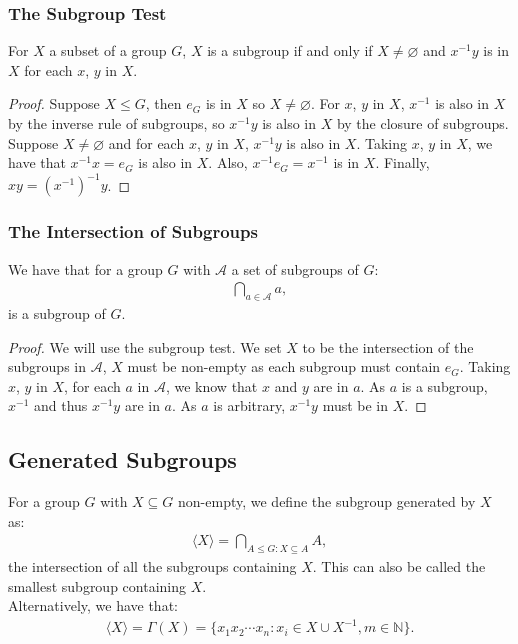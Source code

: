 \subsubsection{The Subgroup Test}

For $X$ a subset of a group $G$, $X$ is a subgroup if and only if $X \neq \varnothing$
and $x^{-1}y$ is in $X$ for each $x$, $y$ in $X$.

\begin{proof}
    Suppose $X \leq G$, then $e_G$ is in $X$ so $X \neq \varnothing$. For $x$, $y$ in $X$,
    $x^{-1}$ is also in $X$ by the inverse rule of subgroups, so $x^{-1}y$ is also
    in $X$ by the closure of subgroups.
    \\[\baselineskip]
    Suppose $X \neq \varnothing$ and for each $x$, $y$ in $X$, $x^{-1}y$ is also in $X$.
    Taking $x$, $y$ in $X$, we have that $x^{-1}x = e_G$ is also in $X$. 
    Also, $x^{-1}e_G = x^{-1}$ is in $X$. Finally, $xy = (x^{-1})^{-1}y$.
\end{proof}

\subsubsection{The Intersection of Subgroups}

We have that for a group $G$ with $\mathcal{A}$ a set of subgroups of $G$: \begin{align*}
    \bigcap_{a \in \mathcal{A}} a,
\end{align*} is a subgroup of $G$.

\begin{proof}
    We will use the subgroup test. We set $X$ to be the intersection of
    the subgroups in $\mathcal{A}$, $X$ must be non-empty as each subgroup
    must contain $e_G$. Taking $x$, $y$ in $X$, for each $a$ in $\mathcal{A}$,
    we know that $x$ and $y$ are in $a$. As $a$ is a subgroup, $x^{-1}$ and
    thus $x^{-1}y$ are in $a$. As $a$ is arbitrary, $x^{-1}y$ must be in $X$.
\end{proof}

\subsection{Generated Subgroups}

For a group $G$ with $X \subseteq G$ non-empty, we define the subgroup generated by $X$ as:
\begin{align*}
    \langle X \rangle = \bigcap_{A \leq G : X \subseteq A} A,
\end{align*} the intersection of all the subgroups containing $X$.
This can also be called the smallest subgroup containing $X$.
\\[\baselineskip]
Alternatively, we have that: \begin{align*}
    \langle X \rangle = \Gamma(X) = \{x_1 x_2 \cdots x_n : x_i \in X \cup X^{-1}, m \in \mathbb{N} \}.
\end{align*}

